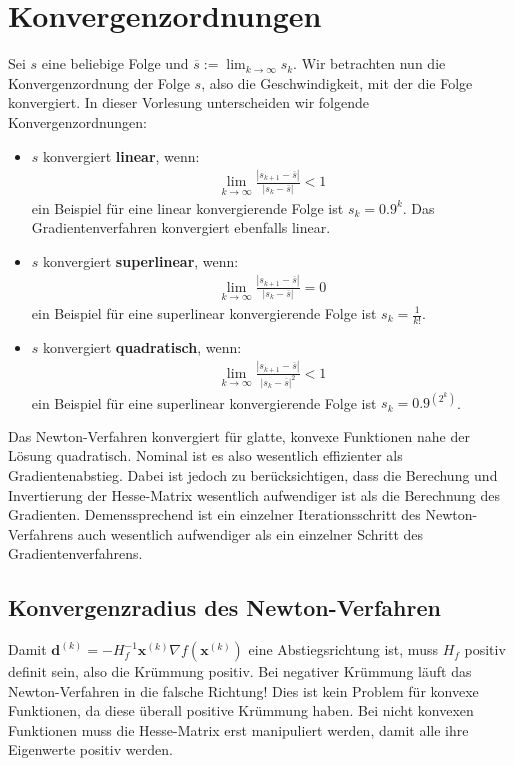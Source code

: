 \documentclass{report}
\newcommand{\tbf}{\textbf}
\newcommand{\xk}{\bm{x}^{(k)}}
\newcommand{\dk}{\bm{d}^{(k)}}
\begin{document}
\section{Konvergenzordnungen}
Sei $s$ eine beliebige Folge und
$\overline{s} := \lim_{k \to \infty} s_k$. Wir betrachten nun die Konvergenzordnung der Folge $s$, also die Geschwindigkeit, mit der die Folge konvergiert. In dieser Vorlesung unterscheiden wir folgende Konvergenzordnungen:
\begin{itemize}
 \item $s$ konvergiert \tbf{linear}, wenn:
 \begin{align*}
  \lim_{k \to \infty} \frac{|s_{k+1} - \overline{s}|}{|s_{k} - \overline{s}|} < 1
 \end{align*}
 ein Beispiel für eine linear konvergierende Folge ist $s_k = 0.9^k$. Das Gradientenverfahren konvergiert ebenfalls linear.
 \item $s$ konvergiert \tbf{superlinear}, wenn:
 \begin{align*}
  \lim_{k \to \infty} \frac{|s_{k+1} - \overline{s}|}{|s_{k} - \overline{s}|} = 0
 \end{align*}
 ein Beispiel für eine superlinear konvergierende Folge ist $s_k = \frac{1}{k!}$.
 \item $s$ konvergiert \tbf{quadratisch}, wenn:
 \begin{align*}
  \lim_{k \to \infty} \frac{|s_{k+1} - \overline{s}|}{|s_{k} - \overline{s}|^2} < 1
 \end{align*}
 ein Beispiel für eine superlinear konvergierende Folge ist $s_k = 0.9^{(2^k)}$.
\end{itemize}
Das Newton-Verfahren konvergiert für glatte, konvexe Funktionen nahe der Lösung quadratisch. Nominal ist es also wesentlich effizienter als Gradientenabstieg. Dabei ist jedoch zu berücksichtigen, dass die Berechung und Invertierung der Hesse-Matrix wesentlich aufwendiger ist als die Berechnung des Gradienten. Demenssprechend ist ein einzelner Iterationsschritt des Newton-Verfahrens auch wesentlich aufwendiger als ein einzelner Schritt des Gradientenverfahrens.
\subsection{Konvergenzradius des Newton-Verfahren}
Damit $\dk = - H_f^{-1} \xk \nabla f(\xk)$ eine Abstiegsrichtung ist, muss $H_f$ positiv definit sein, also die Krümmung positiv. Bei negativer Krümmung läuft das Newton-Verfahren in die falsche Richtung! Dies ist kein Problem für konvexe Funktionen, da diese überall positive Krümmung haben. Bei nicht konvexen Funktionen muss die Hesse-Matrix erst manipuliert werden, damit alle ihre Eigenwerte positiv werden.
\end{document}
